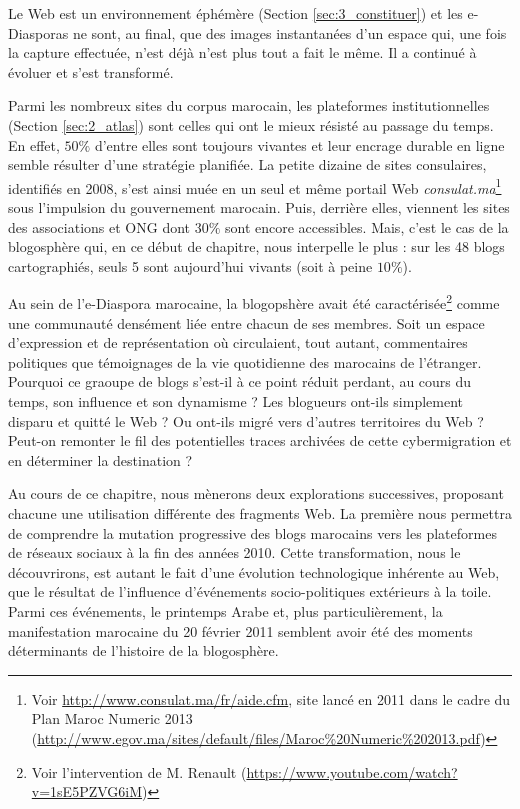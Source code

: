 \documentclass[symmetric,justified,marginals=raggedouter]{tufte-book}
\begin{document}
Le Web est un environnement éphémère (Section \ref{sec:3_constituer}) et les e-Diaspo\-ras ne sont, au final, que des images instantanées d'un espace qui, une fois la capture effectuée, n'est déjà n'est plus tout a fait le même. Il a continué à évoluer et s'est transformé. 

Parmi les nombreux sites du corpus marocain, les plateformes institutionnelles (Section \ref{sec:2_atlas}) sont celles qui ont le mieux résisté au passage du temps. En effet, $50\%$ d'entre elles sont toujours vivantes et leur encrage durable en ligne semble résulter d'une stratégie planifiée. La petite dizaine de sites consulaires, identifiés en 2008, s'est ainsi muée en un seul et même portail Web \textit{consulat.ma}\footnote{Voir \url{http://www.consulat.ma/fr/aide.cfm}, site lancé en 2011 dans le cadre du Plan Maroc Numeric 2013 (\url{http://www.egov.ma/sites/default/files/Maroc\%20Numeric\%202013.pdf})} sous l'impulsion du gouvernement marocain. Puis, derrière elles, viennent les sites des associations et ONG dont $30\%$ sont encore accessibles. Mais, c'est le cas de la blogosphère qui, en ce début de chapitre, nous interpelle le plus : sur les 48 blogs cartographiés, seuls 5 sont aujourd'hui vivants (soit à peine $10\%$).

Au sein de l'e-Diaspora marocaine, la blogopshère avait été caractérisée\footnote{Voir l'intervention de M. Renault (\url{https://www.youtube.com/watch?v=1sE5PZVG6iM})} comme une communauté densément liée entre chacun de ses membres. Soit un espace d'expression et de représentation où circulaient, tout autant, commentaires politiques que témoignages de la vie quotidienne des marocains de l'étranger. Pourquoi ce graoupe de blogs s'est-il à ce point réduit perdant, au cours du temps, son influence et son dynamisme ? Les blogueurs ont-ils simplement disparu et quitté le Web ? Ou ont-ils migré vers d'autres territoires du Web ? Peut-on remonter le fil des potentielles traces archivées de cette cybermigration et en déterminer la destination ?

Au cours de ce chapitre, nous mènerons deux explorations successives, proposant chacune une utilisation différente des fragments Web. La première nous permettra de comprendre la mutation progressive des blogs marocains vers les plateformes de réseaux sociaux à la fin des années 2010. Cette transformation, nous le découvrirons, est autant le fait d'une évolution technologique inhérente au Web, que le résultat de l'influence d'événements socio-politiques extérieurs à la toile. Parmi ces événements, le printemps Arabe et, plus particulièrement, la manifestation marocaine du 20 février 2011 semblent avoir été des moments déterminants de l'histoire de la blogosphère. 
\end{document}
